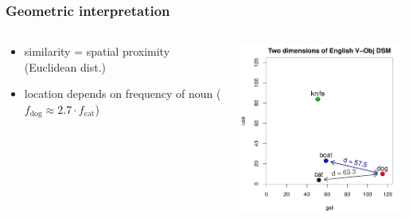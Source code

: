 \begin{frame}
  \frametitle{Geometric interpretation}

  \begin{columns}[T]
    \begin{column}{40mm}
      \begin{itemize}
      \item similarity = spatial proximity (Euclidean dist.)
      \item location depends on frequency of noun ($f_{\text{dog}} \approx 2.7\cdot f_{\text{cat}}$)
      \end{itemize}
    \end{column}
    \begin{column}{75mm}      
      \ungap[1]
      \includegraphics[width=75mm]{img/hieroglyph_2d_2}
    \end{column}
  \end{columns}
\end{frame}

